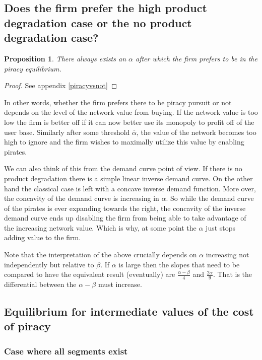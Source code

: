 \documentclass[11pt]{article}
\newtheorem{proposition}{Proposition}
\begin{document}
\subsection{Does the firm prefer the high product degradation case or the no product degradation case? }

\begin{proposition}
\label{piracyvsnotproposition}
There always exists an $\alpha$ after which the firm prefers to be in the piracy equilibrium.
\end{proposition}

\begin{proof}
See appendix \ref{piracyvsnot}
\end{proof}

In other words, whether the firm prefers there to be piracy pursuit or not depends on the level of the network value from buying. If the network value is too low the firm is better off if it can now better use its monopoly to profit off of the user base. Similarly after some threshold $\overline{\alpha}$, the value of the network becomes too high to ignore and the firm wishes to maximally utilize this value by enabling pirates. 

We can also think of this from the demand curve point of view. If there is no product degradation there is a simple linear inverse demand curve. On the other hand the classical case is left with a concave inverse demand function. More over, the concavity of the demand curve is increasing in $\alpha$. So while the demand curve of the pirates is ever expanding towards the right, the concavity of the inverse demand curve ends up disabling the firm from being able to take advantage of the increasing network value. Which is why, at some point the $\alpha$ just stops adding value to the firm.

Note that the interpretation of the above crucially depends on $\alpha$ increasing not independently but relative to $\beta$. If $\alpha$ is large then the slopes that need to be compared to have the equivalent result (eventually) are $\frac{\alpha - \beta}{4}$ and $\frac{2 \alpha}{9}$. That is the differential between the $\alpha-\beta$ must increase. 


\subsection{ Equilibrium for intermediate values of the cost of piracy}

\subsubsection{Case where all segments exist}
\end{document}
